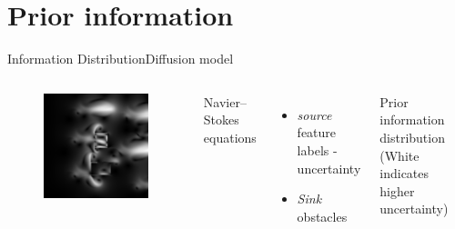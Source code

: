 \section{Prior information}

\begin{frame}{Information Distribution}{Diffusion model}

\begin{columns}
\begin{figure}
\centering
\includegraphics[width = \textwidth]{./screenshot/diffusion.png}
\end{figure}

\begin{minipage}{\textwidth}
Navier–Stokes equations \\
\begin{itemize}
\item \emph{source} feature labels - uncertainty
\item \emph{Sink} obstacles
\end{itemize}
Prior information distribution (White indicates higher uncertainty)
\end{minipage}
\end{columns}

\end{frame}

